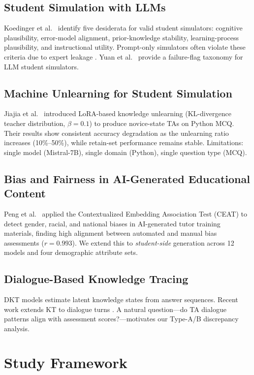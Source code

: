 \documentclass[10pt,twocolumn]{IEEEtran}
\begin{document}
\subsection{Student Simulation with LLMs}
Koedinger et al.\ \cite{koedinger2015} identify five desiderata for valid student
simulators: cognitive plausibility, error-model alignment, prior-knowledge
stability, learning-process plausibility, and instructional utility. Prompt-only
simulators often violate these criteria due to expert leakage \cite{benedetto2024using,
tian2025large}. Yuan et al.\ \cite{yuan2026} provide a failure-flag taxonomy
for LLM student simulators.

\subsection{Machine Unlearning for Student Simulation}
Jiajia et al.\ \cite{Jiajia2026} introduced LoRA-based knowledge unlearning
(KL-divergence teacher distribution, \(\beta=0.1\)) to produce novice-state TAs
on Python MCQ. Their results show consistent accuracy degradation as the
unlearning ratio increases (10\%--50\%), while retain-set performance remains
stable. Limitations: single model (Mistral-7B), single domain (Python), single
question type (MCQ).

\subsection{Bias and Fairness in AI-Generated Educational Content}
Peng et al.\ \cite{peng2025ceat} applied the Contextualized Embedding Association
Test (CEAT) \cite{guo2021ceat} to detect gender, racial, and national biases in
AI-generated tutor training materials, finding high alignment between automated
and manual bias assessments (\(r=0.993\)). We extend this to
\textit{student-side} generation across 12 models and four demographic attribute sets.

\subsection{Dialogue-Based Knowledge Tracing}
DKT models \cite{piech2015dkt} estimate latent knowledge states from answer
sequences. Recent work extends KT to dialogue turns \cite{dlkt2024}.
A natural question—do TA dialogue patterns align with assessment scores?—motivates
our Type-A/B discrepancy analysis.

\section{Study Framework}
\end{document}
